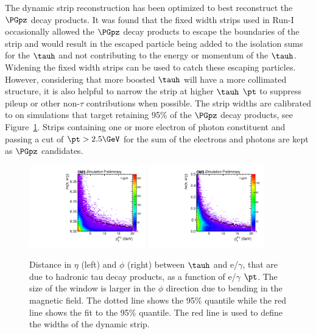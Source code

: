 The dynamic strip reconstruction has been optimized to best reconstruct the $\PGpz$ 
decay products. It was found that the fixed width strips used in Run-I
occasionally allowed the $\PGpz$ decay products to escape the boundaries of the strip and would result in
the escaped particle being added to the isolation sums for the $\tauh$ and not contributing
to the energy or momentum of the $\tauh$. Widening the fixed width strips can be used to catch
these escaping particles. However, considering that more boosted $\tauh$ will have a more 
collimated structure, it is also helpful to narrow the strip at higher $\tauh$ $\pt$ to suppress
pileup or other non-$\tau$ contributions when possible. The strip widths are calibrated to
on simulations that target retaining 95\% of the $\PGpz$ decay products, see Figure~\ref{fig:tau_dyn_strip}.
Strips containing one or more electron of photon constituent and passing a cut of $\pt > 2.5\GeV$
for the sum of the electrons and photons are kept as $\PGpz$ candidates. 

\begin{figure}[htbp]
\centering
     \includegraphics[width=0.45\textwidth]{object_reconstruction_and_selection/plots/tau_dyn_strip_eta.pdf}
     \includegraphics[width=0.45\textwidth]{object_reconstruction_and_selection/plots/tau_dyn_strip_phi.pdf}
     \caption{
Distance in $\eta$ (left) and $\phi$ (right) between $\tauh$ and e/$\gamma$, that are due to 
hadronic tau decay
products, as a function of e/$\gamma$ $\pt$. The size of the window is larger in the $\phi$
direction due to bending in the magnetic field. The dotted line shows the 95\%
quantile while the red line shows the fit to the 95\% quantile. The red line is used
to define the widths of the dynamic strip.
     }
     \label{fig:tau_dyn_strip}
\end{figure}

